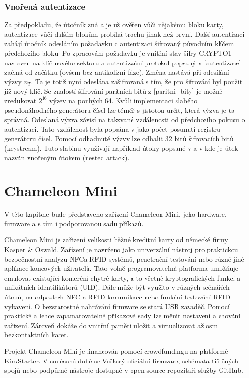 \subsection{Vnořená autentizace}
Za předpokladu, že útočník zná a je už ověřen vůči nějakému bloku karty, autentizace vůči dalším blokům probíhá trochu jinak než první. Další autentizaci zahájí útočník odesláním požadavku o autentizaci šifrovaný původním klíčem předchozího bloku. Po zpracování požadavku je vnitřní stav šifry CRYPTO1 nastaven na klíč nového sektoru a autentizační protokol popsaný v \ref{autentizace} začíná od začátku (ovšem bez antikolizní fáze). Změna nastává při odesílání výzvy $n_T$. Ta je totiž nyní odeslána zašifrovaná s tím, že pro šifrování byl použit již nový klíč. Se znalostí šifrování paritních bitů z \ref{paritni_bity} je možné zredukovat $2^16$ výzev na pouhých 64. Kvůli implementaci slabého pseudonáhodného generátoru čísel lze téměř s jistotou určit, která výzva je ta správná. Odeslaná výzva závisí na takzvané vzdálenosti od předchozího pokusu o autentizaci. Tato vzdálenost byla popsána v \cite{Dismantling_Mifare_Classic} jako počet posunutí registru generátoru čísel. Pomocí odhadnuté výzvy lze odhalit 32 bitů šifrovacích bitů (keystream)\cite{Dismantling_Mifare_Classic}.
Tuto slabinu využívají například útoky popsané v \cite{Cryptanalisis} a v \cite{Wirelessly_Pickpocketing} kde je útok nazván vnořeným útokem (nested attack).

\chapter{Chameleon Mini}
\label{chameleon_mini}

V této kapitole bude představeno zařízení Chameleon Mini, jeho hardware, firmware a s tím i podporovanou sadu příkazů.

\par

Chameleon Mini je zařízení velikosti běžné kreditní karty od německé firmy Kasper \& Oswald. Zařízení je navrženo jako univerzální nástroj pro praktickou bezpečnostní analýzu NFC\footnotemark a RFID systémů, penetrační testování nebo různé jiné aplikace koncových uživatelů. Tato volně programovatelná platforma umožňuje emulovat existující komerční chytré karty, a to včetně kryptografických funkcí a unikátních identifikátorů (UID). Dále může být využito v různých scénářích útoků, na odposlech NFC a RFID komunikace nebo funkční testování RFID vybavení. O bezstarostné nahrávání firmware se stará USB zavaděč. Pomocí praktické a lehce zapamatovatelné příkazové sady lze měnit nastavení a chování zařízení. Zároveň dokáže do vnitřní paměti uložit a virtualizovat až osm bezkontaktních karet.\cite{ChameleonKickStarter} 
\par 
Projekt Chameleon Mini je financován pomocí crowdfundingu na platformě KickStarter. V současné době se  Veškerý oficiální firmware, schémata tištěných spojů nebo podpůrné nástroje dostupné v {open-source} repozitáři služby GitHub\footnotemark.

